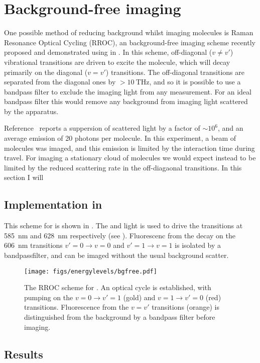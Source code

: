 \section{Background-free imaging}


One possible method of reducing background whilst imaging molecules is Raman
Resonance Optical Cycling (RROC), an background-free imaging scheme recently
proposed and demonstrated using \SrF{} in . In this scheme,
off-diagonal ($v\neq v'$) vibrational transitions are driven to excite the
molecule, which will decay primarily on the diagonal ($v=v'$) transitions. The
off-diagonal transitions are separated from the diagonal ones by
$>\SI{10}{\tera\hertz}$, and so it is possible to use a bandpass filter to
exclude the imaging light from any measurement. For an ideal bandpass filter
this would remove any background from imaging light scattered by the apparatus.

Reference~\cite{Shaw2021} reports a suppersion of scattered light by a factor
of $\sim10^6$, and an average emission of 20 photons per molecule. In this
experiment, a beam of molecules was imaged, and this emission is limited by the
interaction time during travel. For imaging a stationary cloud of molecules we
would expect instead to be limited by the reduced scattering rate in the
off-diagaonal transitions. In this section I will 

\subsection{Implementation in \CaF{}}


This scheme for \CaF{} is shown in . The
 and  light is used to drive the transitions at
\SI{585}{\nano\meter} and \SI{628}{\nano\meter} respectively (see
). Fluorescenc from the decay on the
\SI{606}{\nano\meter} transitions $v'=0\rightarrow v=0$ and $v'=1\rightarrow
v=1$ is isolated by a bandpassfilter, and can be imaged without the usual
background scatter.

\begin{figure}
  \centering
  \texttt{[image: figs/energylevels/bgfree.pdf]}
  \caption{
  The RROC scheme for \CaF{}. An optical cycle is established, with pumping on
  the $v=0 \rightarrow v'=1$ (gold) and $v=1 \rightarrow v'=0$ (red) transitions.
  Fluorescence from the $v=v'$ transitions (orange) is distinguished from the
  background by a bandpass filter before imaging.
  }
  \label{exper:fig:bgfreelevels}
\end{figure}

\subsection{Results}

